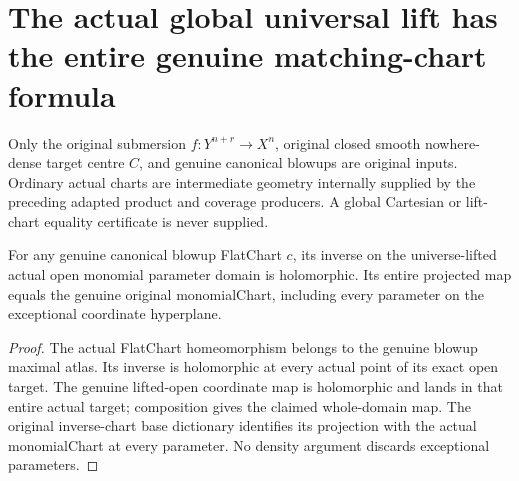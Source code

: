 \section{The actual global universal lift has the entire genuine matching-chart formula}
Only the original submersion $f:Y^{n+r}\to X^n$, original closed smooth nowhere-dense target centre $C$, and genuine canonical blowups are original inputs. Ordinary actual charts are intermediate geometry internally supplied by the preceding adapted product and coverage producers. A global Cartesian or lift-chart equality certificate is never supplied.

\begin{lemma}
\label{hir:submersion-global-lift-true-parameter-map}
\leanok
{}
For any genuine canonical blowup FlatChart $c$, its inverse on the universe-lifted actual open monomial parameter domain is holomorphic. Its entire projected map equals the genuine original monomialChart, including every parameter on the exceptional coordinate hyperplane.
\end{lemma}
\begin{proof}
The actual FlatChart homeomorphism belongs to the genuine blowup maximal atlas. Its inverse is holomorphic at every actual point of its exact open target. The genuine lifted-open coordinate map is holomorphic and lands in that entire actual target; composition gives the claimed whole-domain map. The original inverse-chart base dictionary identifies its projection with the actual monomialChart at every parameter. No density argument discards exceptional parameters.
\end{proof}

